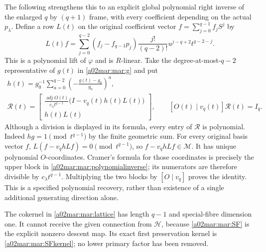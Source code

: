 The following strengthens this to an explicit global polynomial
right inverse of the enlarged $q$ by $(q+1)$ frame, with every
coefficient depending on the actual $p_\lambda$. Define a row
$L(t)$ on the original coefficient vector $f=\sum_{j=0}^{q-1}f_jS^j$ by
\begin{equation}\tag{MAR15}\label{a02mar:mar:liftrow}
 L(t)f=\sum_{j=0}^{q-2}(f_j-f_{q-1}p_j)
              \frac{j!}{(q-2)!}u^{j-q+2}t^{q-2-j}.
\end{equation}
This is a polynomial lift of $\varphi$ and is $R$-linear.
Take the degree-at-most-$q-2$ representative of $g(t)$ in
\eqref{a02mar:mar:g} and put
\begin{equation}\tag{MAR16}\label{a02mar:mar:polynomialinverse}
 \begin{gathered}
 h(t)=g_0^{-1}\sum_{a=0}^{q-2}
               \left(-\frac{g(t)-g_0}{g_0}\right)^a,\\
 \mathcal R(t)=
 \begin{bmatrix}
 \displaystyle\frac{\operatorname{adj}O(t)}{c_\lambda t^{q-1}}
                   \bigl(I-v_q(t)h(t)L(t)\bigr)\\[3pt]
 h(t)L(t)
 \end{bmatrix},\qquad
 [O(t)\mid v_q(t)]\mathcal R(t)=I_q.
 \end{gathered}
\end{equation}
Although a division is displayed in its formula, every entry of
$\mathcal R$ is polynomial. Indeed $h g=1\pmod{t^{q-1}}$ by
the finite geometric sum. For every original basis vector $f$,
$L(f-v_qhLf)=0\pmod{t^{q-1}}$, so $f-v_qhLf\in\mathscr M$.
It has unique polynomial $O$-coordinates. Cramer's formula for those
coordinates is precisely the upper block in \eqref{a02mar:mar:polynomialinverse};
its numerators are therefore divisible by $c_\lambda t^{q-1}$.
Multiplying the two blocks by $[O\mid v_q]$ proves the identity.
This is a specified polynomial recovery, rather than existence of a
single additional generating direction alone.

The cokernel in \eqref{a02mar:mar:lattice} has length $q-1$ and special-fibre
dimension one. It cannot receive the given connection from
$\mathscr H$, because \eqref{a02mar:mar:SF} is the explicit nonzero descent
map. Its exact first preservation kernel is
\eqref{a02mar:mar:SFkernel}; no lower primary factor has been removed.

